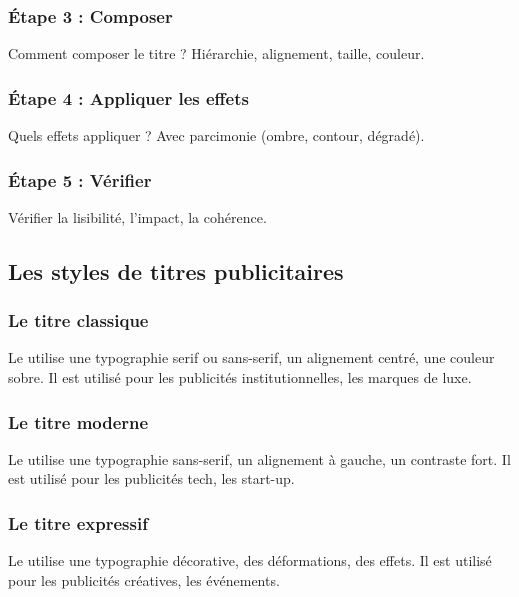 \subsubsection{Étape 3 : Composer}

Comment composer le titre ? Hiérarchie, alignement, taille, couleur.

\subsubsection{Étape 4 : Appliquer les effets}

Quels effets appliquer ? Avec parcimonie (ombre, contour, dégradé).

\subsubsection{Étape 5 : Vérifier}

Vérifier la lisibilité, l'impact, la cohérence.

\subsection{Les styles de titres publicitaires}

\subsubsection{Le titre classique}

Le  utilise une typographie serif ou sans-serif, un alignement centré, une couleur sobre. Il est utilisé pour les publicités institutionnelles, les marques de luxe.

\subsubsection{Le titre moderne}

Le  utilise une typographie sans-serif, un alignement à gauche, un contraste fort. Il est utilisé pour les publicités tech, les start-up.

\subsubsection{Le titre expressif}

Le  utilise une typographie décorative, des déformations, des effets. Il est utilisé pour les publicités créatives, les événements.

